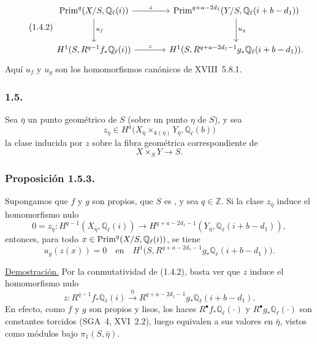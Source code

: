 \pageoriginale

\begin{equation}\tag{1.4.2}
\begin{tikzcd}[column sep=large,row sep=large]
\mathrm{Prim}^q(X/S,\mathbb Q_\ell(i))
 \arrow[r,"z"] \arrow[d,"u_f"]
& \mathrm{Prim}^{q+a-2d_1}(Y/S,\mathbb Q_\ell(i+b-d_1))
 \arrow[d,"u_g"] \\
H^1(S,R^{q-1}f_*\mathbb Q_\ell(i)) \arrow[r,"z"]
& H^1(S,R^{q+a-2d_1-1}g_*\mathbb Q_\ell(i+b-d_1)).
\end{tikzcd}
\end{equation}
Aquí $u_f$ y $u_g$ son los homomorfismos canónicos de XVIII~5.8.1.

\subsubsection*{1.5.}
Sea $\bar\eta$ un punto geométrico de $S$ (sobre un punto $\eta$ de
$S$), y sea
\begin{equation}\tag{1.5.1}
z_{\bar\eta}\in
H^a\bigl(X_{\bar\eta}\times_{k(\bar\eta)}Y_{\bar\eta},
\mathbb Q_\ell(b)\bigr)
\end{equation}
la clase inducida por $z$ sobre la fibra geométrica correspondiente de
\begin{equation}\tag{1.5.2}
X\times_S Y\longrightarrow S.
\end{equation}

\subsubsection*{Proposición 1.5.3.}
Supongamos que $f$ y $g$ son propios, que $S$ es
, y sea $q\in\mathbb Z$. Si la clase $z_{\bar\eta}$
induce el homomorfismo nulo
\begin{equation}\tag{1.5.3}
0=z_{\bar\eta}:H^{q-1}(X_{\bar\eta},\mathbb Q_\ell(i))
\longrightarrow
H^{q+a-2d_1-1}(Y_{\bar\eta},\mathbb Q_\ell(i+b-d_1)),
\end{equation}
entonces, para todo
$\sisi{X}{x}\in\mathrm{Prim}^q(X/S,\mathbb Q_\ell(i))$, se tiene
\begin{equation}\tag{1.5.4}
u_g(z(x))=0\quad\text{en}\quad
H^1\bigl(S,R^{q+a-2d_1-1}g_*\mathbb Q_\ell(i+b-d_1)\bigr).
\end{equation}

\pageoriginale

\noindent\underline{Demostración.}
Por la conmutatividad de (1.4.2), basta ver que $z$ induce el
homomorfismo nulo
\begin{equation}\tag{1.5.5}
z:R^{q-1}f_*\mathbb Q_\ell(i)
\stackrel{0}{\longrightarrow}
R^{q+a-2d_1-1}g_*\mathbb Q_\ell(i+b-d_1).
\end{equation}
En efecto, como $f$ y $g$ son propios y lisos, los haces
$R^\bullet f_*\mathbb Q_\ell(\mathord\cdot)$ y
$R^\bullet g_*\mathbb Q_\ell(\mathord\cdot)$ son constantes torcidos
(SGA~4, XVI~2.2), luego equivalen a sus valores en $\bar\eta$, vistos
como módulos bajo $\pi_1(S,\bar\eta)$.

